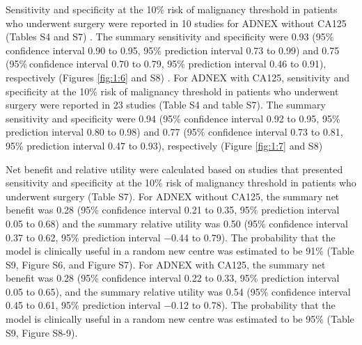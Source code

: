 Sensitivity and specificity at the 10\% risk of malignancy threshold in patients who underwent surgery were reported in 10 studies for ADNEX without CA125 (Tables S4 and S7)
 \cite{vancalsterValidationModelsDiagnose2020,chenComparisonORADSADNEX2022,
  diazOvarianTumorsRisk2017a,hiettPerformanceIOTASimple2022,
  lamhuongOptimalCutOffPoint2022,pelayoComparisonUltrasoundScores2023,
  poonyakanokPreoperativeEvaluationADNEX2021,
  qianComparisonDiagnosticPerformances2021,
  sayasnehEvaluatingRiskOvarian2016,
  zhangExternalValidationAssessment2022}.
The summary sensitivity and specificity were 0.93 (95\% confidence interval 0.90 to 0.95, 95\% prediction interval 0.73 to 0.99) and 0.75 (95\% confidence interval 0.70 to 0.79, 95\% prediction interval 0.46 to 0.91), respectively (Figures \ref{fig:1:6} and S8)
 \cite{vancalsterValidationModelsDiagnose2020,
  jeongValidationIOTAADNEXModel2020,araujoPerformanceIOTAADNEX2017,
  chenComparisonORADSADNEX2022,diazOvarianTumorsRisk2017a,
  heEstimatingRiskMalignancy2021,
  joyeuxSurgeryPredictabilityMalignant2016,laiComparisonORADSGIRADS2022,
  lamhuongOptimalCutOffPoint2022,meysEstimatingRiskMalignancy2017,
  namAssessmentDifferentNEoplasias2021,
  pelayoComparisonUltrasoundScores2023,pengEvaluationDiagnosticValue2021,
  poonyakanokPreoperativeEvaluationADNEX2021,
  qianComparisonDiagnosticPerformances2021,
  sandalComparisionRiskMalignancy2018a,sayasnehEvaluatingRiskOvarian2016,
  stukanDevelopmentValidationModel2019,szubertExternalValidationIOTA2016,
  tugPreoperativeDiscriminatingPerformance2020,vioraADNEXModelTriage2020,
  wangEvaluatingRiskMalignancy2023,yangPerformanceIOTAADNEX2022,
  zhangExternalValidationAssessment2022}.
For ADNEX with CA125, sensitivity and specificity at the 10\% risk of malignancy threshold in patients who underwent surgery were reported in 23 studies (Table S4 and table S7). The summary sensitivity and specificity were 0.94 (95\% confidence interval 0.92 to 0.95, 95\% prediction interval 0.80 to 0.98) and 0.77 (95\% confidence interval 0.73 to 0.81, 95\% prediction interval 0.47 to 0.93), respectively (Figure \ref{fig:1:7} and S8)

Net benefit and relative utility were calculated based on studies that presented sensitivity and specificity at the 10\% risk of malignancy threshold in patients who underwent surgery (Table
S7). For ADNEX without CA125, the summary net benefit was 0.28 (95\% confidence interval 0.21 to 0.35, 95\% prediction interval 0.05 to 0.68) and the summary relative utility was 0.50 (95\% confidence interval 0.37 to 0.62, 95\% prediction interval −0.44 to 0.79). The probability that the model is clinically useful in a random new centre was estimated to be 91\% (Table S9, Figure S6, and Figure S7). For ADNEX with CA125, the summary net benefit was 0.28 (95\% confidence interval 0.22 to 0.33, 95\% prediction interval 0.05 to 0.65), and the summary relative utility was 0.54 (95\% confidence interval 0.45 to 0.61, 95\% prediction interval −0.12 to 0.78). The probability that the model is clinically useful in a random new centre was estimated to be 95\% (Table S9, Figure S8-9).

